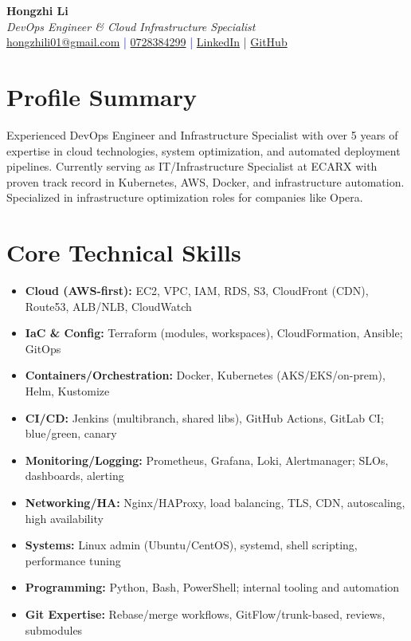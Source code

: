 \documentclass[11pt,a4paper]{article}
\begin{document}
\pagestyle{empty} %

\begin{center}
{\LARGE \textbf{Hongzhi Li}}\\[10pt]
{\Large \textit{DevOps Engineer \& Cloud Infrastructure Specialist}}\\[10pt]
\textcolor{darkblue}{\href{mailto:hongzhili01@gmail.com}{hongzhili01@gmail.com} | \href{tel:0728384299}{0728384299} | \href{https://www.linkedin.com/in/hzl/}{LinkedIn} | \href{https://github.com/bluehawana}{GitHub}}
\end{center}

\section*{Profile Summary}
Experienced DevOps Engineer and Infrastructure Specialist with over 5 years of expertise in cloud technologies, system optimization, and automated deployment pipelines. Currently serving as IT/Infrastructure Specialist at ECARX with proven track record in Kubernetes, AWS, Docker, and infrastructure automation. Specialized in infrastructure optimization roles for companies like Opera.

\section*{Core Technical Skills}
\begin{itemize}[noitemsep]
\item \textbf{Cloud (AWS-first):} EC2, VPC, IAM, RDS, S3, CloudFront (CDN), Route53, ALB/NLB, CloudWatch
\item \textbf{IaC \& Config:} Terraform (modules, workspaces), CloudFormation, Ansible; GitOps
\item \textbf{Containers/Orchestration:} Docker, Kubernetes (AKS/EKS/on-prem), Helm, Kustomize
\item \textbf{CI/CD:} Jenkins (multibranch, shared libs), GitHub Actions, GitLab CI; blue/green, canary
\item \textbf{Monitoring/Logging:} Prometheus, Grafana, Loki, Alertmanager; SLOs, dashboards, alerting
\item \textbf{Networking/HA:} Nginx/HAProxy, load balancing, TLS, CDN, autoscaling, high availability
\item \textbf{Systems:} Linux admin (Ubuntu/CentOS), systemd, shell scripting, performance tuning
\item \textbf{Programming:} Python, Bash, PowerShell; internal tooling and automation
\item \textbf{Git Expertise:} Rebase/merge workflows, GitFlow/trunk-based, reviews, submodules
\end{itemize}
\end{document}
